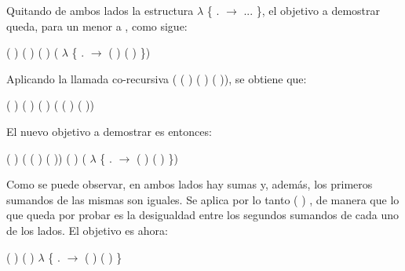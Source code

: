 \begin{AgdaAlign}
Quitando de ambos lados la estructura  $\lambda$ \{ . $\rightarrow$ ... \}, el objetivo a demostrar queda, para un  menor a , como sigue:
\begin{center}
\AgdaFunction{[}  \AgdaFunction{]}  ( ) (  \AgdaFunction{+}  ) \AgdaFunction{$\leq$} ( ) \AgdaFunction{+} ( $\lambda$ \{ . $\rightarrow$  ( ) ( ) \})
\end{center}

Aplicando la llamada co-recursiva (  ( ) ( ) ( )), se obtiene que:
\begin{center}
\AgdaFunction{[}  \AgdaFunction{]}  ( ) (  \AgdaFunction{+}  ) \AgdaFunction{$\leq$} ( ) \AgdaFunction{+} ( ( ) ( ))
\end{center}

El nuevo objetivo a demostrar es entonces:
\begin{center}
\AgdaFunction{[}  \AgdaFunction{]} ( ) \AgdaFunction{+} ( ( ) ( )) \AgdaFunction{$\leq$} ( ) \AgdaFunction{+} ( $\lambda$ \{ . $\rightarrow$  ( ) ( ) \})
\end{center}

Como se puede observar, en ambos lados hay sumas y, además, los primeros sumandos de las mismas son iguales. Se aplica por lo tanto  ( ) , de manera que lo que queda por probar es la desigualdad entre los segundos sumandos de cada uno de los lados. El objetivo es ahora:
\begin{center}
\AgdaFunction{[}  \AgdaFunction{]}  ( ) ( ) \AgdaFunction{$\leq$}  $\lambda$ \{ . $\rightarrow$  ( ) ( ) \}
\end{center}


\end{AgdaAlign}
